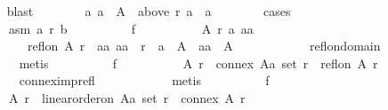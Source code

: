 \begin{isabellebody}
\ \ \ \ \ \ \ \ \isamarkupfalse%
\ blast\isanewline
\ \ \ \ \ \ \isamarkupfalse%
\ {\isachardoublequoteopen}{\isasymexists}a{\isachardot}{\kern0pt}\ a\ {\isasymin}\ A\ {\isasymand}\ above\ r\ a\ {\isacharequal}{\kern0pt}\ {\isacharbraceleft}{\kern0pt}a{\isacharbraceright}{\kern0pt}{\isachardoublequoteclose}\isanewline
\ \ \ \ \ \ \isamarkupfalse%
\ cases\isanewline
\ \ \ \ \ \ \ \ \isamarkupfalse%
\isanewline
\ \ \ \ \ \ \ \ \ \ asm{}{\isacharcolon}{\kern0pt}\ {\isachardoublequoteopen}a\ {\isasympreceq}\isactrlsub r\ b{\isachardoublequoteclose}\isanewline
\ \ \ \ \ \ \ \ \isamarkupfalse%
\ f{}{\isacharcolon}{\kern0pt}\isanewline
\ \ \ \ \ \ \ \ \ \ {\isachardoublequoteopen}{\isasymforall}A\ r\ a\ aa{\isachardot}{\kern0pt}\isanewline
\ \ \ \ \ \ \ \ \ \ \ \ {\isasymnot}\ refl{\isacharunderscore}{\kern0pt}on\ A\ r\ {\isasymor}\ {\isacharparenleft}{\kern0pt}a{\isacharcolon}{\kern0pt}{\isacharcolon}{\kern0pt}{\isacharprime}{\kern0pt}a{\isacharcomma}{\kern0pt}\ aa{\isacharparenright}{\kern0pt}\ {\isasymnotin}\ r\ {\isasymor}\ a\ {\isasymin}\ A\ {\isasymand}\ aa\ {\isasymin}\ A{\isachardoublequoteclose}\isanewline
\ \ \ \ \ \ \ \ \ \ \isamarkupfalse%
\ refl{\isacharunderscore}{\kern0pt}on{\isacharunderscore}{\kern0pt}domain\isanewline
\ \ \ \ \ \ \ \ \ \ \isamarkupfalse%
\ metis\isanewline
\ \ \ \ \ \ \ \ \isamarkupfalse%
\ f{}{\isacharcolon}{\kern0pt}\isanewline
\ \ \ \ \ \ \ \ \ \ {\isachardoublequoteopen}{\isasymforall}A\ r{\isachardot}{\kern0pt}\ {\isasymnot}\ connex\ {\isacharparenleft}{\kern0pt}A{\isacharcolon}{\kern0pt}{\isacharcolon}{\kern0pt}{\isacharprime}{\kern0pt}a\ set{\isacharparenright}{\kern0pt}\ r\ {\isasymor}\ refl{\isacharunderscore}{\kern0pt}on\ A\ r{\isachardoublequoteclose}\isanewline
\ \ \ \ \ \ \ \ \ \ \isamarkupfalse%
\ connex{\isacharunderscore}{\kern0pt}imp{\isacharunderscore}{\kern0pt}refl\isanewline
\ \ \ \ \ \ \ \ \ \ \isamarkupfalse%
\ metis\isanewline
\ \ \ \ \ \ \ \ \isamarkupfalse%
\ f{}{\isacharcolon}{\kern0pt}\isanewline
\ \ \ \ \ \ \ \ \ \ {\isachardoublequoteopen}{\isasymforall}A\ r{\isachardot}{\kern0pt}\ {\isasymnot}\ linear{\isacharunderscore}{\kern0pt}order{\isacharunderscore}{\kern0pt}on\ {\isacharparenleft}{\kern0pt}A{\isacharcolon}{\kern0pt}{\isacharcolon}{\kern0pt}{\isacharprime}{\kern0pt}a\ set{\isacharparenright}{\kern0pt}\ r\ {\isasymor}\ connex\ A\ r{\isachardoublequoteclose}\isanewline

\end{isabellebody}
